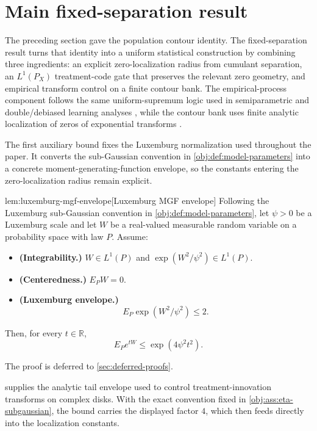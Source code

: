 \documentclass[11pt]{article}
\begin{document}
\section{Main fixed-separation result}

The preceding section gave the population contour identity. The fixed-separation result turns that identity into a uniform statistical construction by combining three ingredients: an explicit zero-localization radius from cumulant separation, an \(L^1(P_X)\) treatment-code gate that preserves the relevant zero geometry, and empirical transform control on a finite contour bank. The empirical-process component follows the same uniform-supremum logic used in semiparametric and double/debiased learning analyses \citep{BickelKlaassenRitovWellner1993,VanDerVaart1998,VanDerVaartWellner1996,ChernozhukovEtAl2018DML}, while the contour bank uses finite analytic localization of zeros of exponential transforms \citep{MichelenSahasrabudhe2019,EremenkoFryntov2021,DinhGhoshTranTran2021}.

The first auxiliary bound fixes the Luxemburg normalization used throughout the paper. It converts the sub-Gaussian convention in \cref{obj:def:model-parameters} into a concrete moment-generating-function envelope, so the constants entering the zero-localization radius remain explicit.

\begin{lemmav}{lem:luxemburg-mgf-envelope}[Luxemburg MGF envelope]
Following the Luxemburg sub-Gaussian convention in \cref{obj:def:model-parameters}, let \(\psi>0\) be a Luxemburg scale and let \(W\) be a real-valued measurable random variable on a probability space with law \(P\). Assume:
\begin{itemize}
\item \textbf{(Integrability.)} \(W\in L^1(P)\) and \(\exp(W^2/\psi^2)\in L^1(P)\).
\item \textbf{(Centeredness.)} \(E_P W=0\).
\item \textbf{(Luxemburg envelope.)}
\[
E_P\exp(W^2/\psi^2)\le 2.
\]
\end{itemize}
Then, for every \(t\in\mathbb R\),
\[
E_P e^{tW}\le \exp(4\psi^2t^2).
\]
\end{lemmav}

The proof is deferred to \cref{sec:deferred-proofs}.

 supplies the analytic tail envelope used to control treatment-innovation transforms on complex disks. With the exact convention fixed in \cref{obj:ass:eta-subgaussian}, the bound carries the displayed factor \(4\), which then feeds directly into the localization constants.
\end{document}
